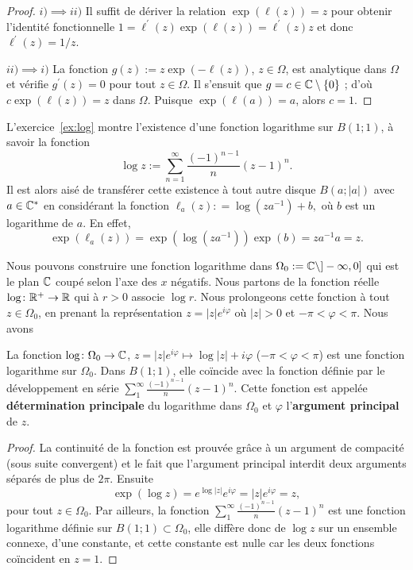 \begin{proof}
$i) \implies ii)$ Il suffit de dériver la relation $\exp(\ell(z))=z$ pour obtenir l'identité fonctionnelle $1=\ell^\prime(z) \exp (\ell(z))=\ell^\prime(z) z$ et donc $\ell^\prime(z)=1/z$.

$ii) \implies i)$ La fonction $g(z) := z \exp(-\ell(z))$, $z \in \Omega$, est analytique dans $\Omega$ et vérifie $g^\prime(z)=0$ pour tout $z \in \Omega$. Il s'ensuit que $g =c \in \mathbb{C} \setminus\{0\}$ ; d'où $c \exp(\ell(z))=z$ dans $\Omega$. Puisque $\exp(\ell(a))=a$, alors $c=1$.
\end{proof}

L'exercice~\ref{ex:log} montre l'existence d'une fonction logarithme sur $B(1;1)$, à savoir la fonction
\[\log z := \sum_{n=1}^\infty  \frac{(-1)^{n-1}}{n}(z-1)^n.\]
Il est alors aisé de transférer cette existence à tout autre disque $B(a ;\lvert a \rvert)$ avec $a \in \mathbb{C}^\ast$ en considérant la fonction $\ell_a(z) : =\log(z a^{-1}) + b,$ où $b$ est un logarithme de $a$. En effet,
\[\exp(\ell_a(z))=\exp(\log(z a^{-1})) \exp(b)=z a^{-1}a=z.\]

Nous pouvons construire une fonction logarithme dans $\Omega_0 := \mathbb{C} \setminus ]-\infty,0]$ qui est le plan $\mathbb{C}$ coupé selon l'axe des $x$ négatifs. Nous partons de la fonction réelle $\log \colon \mathbb R^+ \to \mathbb R$ qui à $r>0$ associe $\log r$. Nous prolongeons cette fonction à tout $z \in \Omega_0$, en prenant la représentation $z=\lvert z\rvert e^{i  \varphi}$ où $\lvert z\rvert>0$ et $-\pi< \varphi < \pi$. Nous avons

\begin{fprop}
La fonction $\log \colon  \Omega_0 \to \mathbb{C}$, $z=\lvert z\rvert e^{i  \varphi} \mapsto \log \lvert z\rvert + i \varphi$ ($-\pi< \varphi < \pi$) est une fonction logarithme sur $\Omega_0$. Dans $B(1 ; 1)$, elle coïncide avec la fonction définie par le développement en série $\sum_1^\infty \frac{(-1)^{n-1}}{n}(z-1)^n$. Cette fonction est appelée \textbf{détermination principale} du logarithme dans $\Omega_0$ et $\varphi$ l'\textbf{argument principal} de $z$.
\end{fprop}
\begin{proof}
La continuité de la fonction est prouvée grâce à un argument de compacité (sous suite convergent) et le fait que l'argument principal interdit deux arguments séparés de plus de $2 \pi$. Ensuite
\[\exp(\log z)=e^{\log \lvert z \rvert} e^{i \varphi}=  \lvert z \rvert e^{i \varphi}=z,\]
pour tout $z\in \Omega_0$. Par ailleurs, la fonction $\sum_1^\infty \frac{(-1)^{n-1}}{n}(z-1)^n$ est une fonction logarithme définie sur $B(1;1)\subset \Omega_0$, elle diffère donc de $\log z$ sur un ensemble connexe, d'une constante, et cette constante est nulle car les deux fonctions coïncident en $z=1$.  
\end{proof}


